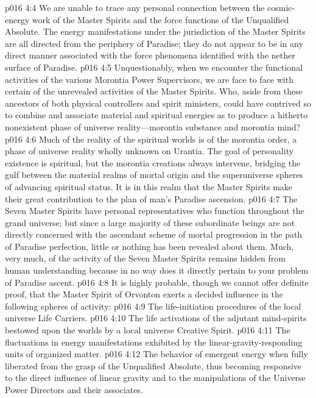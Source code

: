 \vs p016 4:4 We are unable to trace any personal connection between the cosmic\hyp{}energy work of the Master Spirits and the force functions of the Unqualified Absolute. The energy manifestations under the jurisdiction of the Master Spirits are all directed from the periphery of Paradise; they do not appear to be in any direct manner associated with the force phenomena identified with the nether surface of Paradise.
\vs p016 4:5 Unquestionably, when we encounter the functional activities of the various Morontia Power Supervisors, we are face to face with certain of the unrevealed activities of the Master Spirits. Who, aside from these ancestors of both physical controllers and spirit ministers, could have contrived so to combine and associate material and spiritual energies as to produce a hitherto nonexistent phase of universe reality---morontia substance and morontia mind?
\vs p016 4:6 Much of the reality of the spiritual worlds is of the morontia order, a phase of universe reality wholly unknown on Urantia. The goal of personality existence is spiritual, but the morontia creations always intervene, bridging the gulf between the material realms of mortal origin and the superuniverse spheres of advancing spiritual status. It is in this realm that the Master Spirits make their great contribution to the plan of man’s Paradise ascension.
\vs p016 4:7 The Seven Master Spirits have personal representatives who function throughout the grand universe; but since a large majority of these subordinate beings are not directly concerned with the ascendant scheme of mortal progression in the path of Paradise perfection, little or nothing has been revealed about them. Much, very much, of the activity of the Seven Master Spirits remains hidden from human understanding because in no way does it directly pertain to your problem of Paradise ascent.
\pc \vs p016 4:8 It is highly probable, though we cannot offer definite proof, that the Master Spirit of Orvonton exerts a decided influence in the following spheres of activity:
\pc \vs p016 4:9 \bibnobreakspace The life\hyp{}initiation procedures of the local universe Life Carriers.
\vs p016 4:10 \bibnobreakspace The life activations of the adjutant mind\hyp{}spirits bestowed upon the worlds by a local universe Creative Spirit.
\vs p016 4:11 \bibnobreakspace The fluctuations in energy manifestations exhibited by the linear\hyp{}gravity\hyp{}responding units of organized matter.
\vs p016 4:12 \bibnobreakspace The behavior of emergent energy when fully liberated from the grasp of the Unqualified Absolute, thus becoming responsive to the direct influence of linear gravity and to the manipulations of the Universe Power Directors and their associates.
